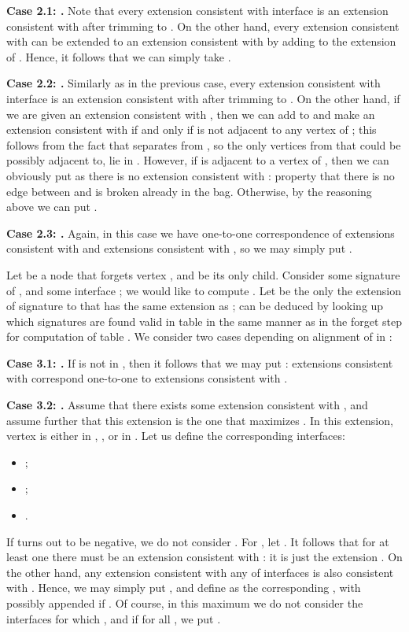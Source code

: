 \documentclass[a4paper,11pt]{article}
\theoremstyle{definition}
\theoremstyle{remark}
\begin{document}
\vskip 0.1cm {\bf{Case 2.1: .}} Note that every extension
consistent with interface  is an extension consistent with
 after trimming to .  On the other hand, every extension
consistent with  can be extended to an extension consistent
with  by adding  to the extension of .  Hence, it follows
that we can simply take .

\vskip 0.1cm {\bf{Case 2.2: .}} Similarly as in the previous
case, every extension consistent with interface  is an extension
consistent with  after trimming to .  On the other hand,
if we are given an extension consistent with , then we can add
 to  and make an extension consistent with  if and only if
 is not adjacent to any vertex of ; this follows from the fact
that  separates  from , so the only vertices from
 that  could be possibly adjacent to, lie in .
However, if  is adjacent to a vertex of , then we can obviously
put  as there is no extension consistent with
: property that there is no edge between  and  is broken
already in the bag.  Otherwise, by the reasoning above we can put
.

\vskip 0.1cm

{\bf{Case 2.3: .}} Again, in this case we have one-to-one
correspondence of extensions consistent with  and extensions
consistent with , so we may simply put .

\vskip 0.3cm

 Let  be a node that forgets
vertex , and  be its only child.  Consider some signature
 of , and some interface ; we
would like to compute .  Let
 be the only the extension of signature  to
 that has the same extension as ;  can be deduced by
looking up which signatures are found valid in table  in the same
manner as in the forget step for computation of table .  We
consider two cases depending on alignment of  in :

\vskip 0.1cm {\bf{Case 3.1: .}} If  is not in , then
it follows that we may put :
extensions consistent with  correspond one-to-one to extensions
consistent with .

\vskip 0.1cm {\bf{Case 3.2: .}} Assume that there exists some
extension  consistent with , and
assume further that this extension is the one that maximizes
.  In this extension, vertex  is either in
, , or in .  Let us define the
corresponding interfaces:
\begin{itemize}
\item ;
\item ;
\item .
\end{itemize}
If  turns out to be negative, we do not consider .  For
, let .  It
follows that for at least one 
there must be an extension consistent with : it is just the
extension .  On the other hand, any
extension consistent with any of interfaces  is
also consistent with .  Hence, we may simply put
, and define  as the corresponding
, with possibly  appended if .  Of course, in this
maximum we do not consider the interfaces  for which
, and if  for
all , we put .
\end{document}
